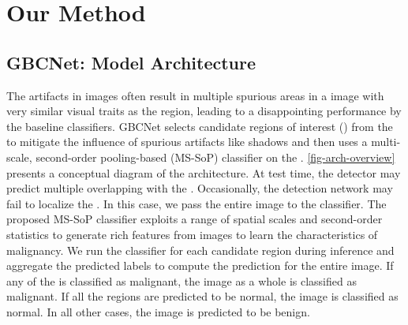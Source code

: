 
\section{Our Method}
%
\subsection{GBCNet: Model Architecture}
%
The artifacts in \usg images often result in multiple spurious areas in a \usg image with very similar visual traits as the \gb region, leading to a disappointing performance by the baseline classifiers. 
GBCNet selects candidate regions of interest (\rois) from the \usg to mitigate the influence of spurious artifacts like shadows and then uses a multi-scale, second-order pooling-based (MS-SoP) classifier on the \rois. \cref{fig-arch-overview} presents a conceptual diagram of the architecture. 
At test time, the detector may predict multiple \rois overlapping with the \gb. Occasionally, the detection network may fail to localize the \rois. In this case, we pass the entire image to the classifier. The proposed MS-SoP classifier exploits a range of spatial scales 
and second-order statistics to generate rich features from \usg images to learn the characteristics of malignancy. We run the classifier for each candidate region during inference and aggregate the predicted labels to compute the prediction for the entire image. If any of the \rois is classified as malignant, the image as a whole is classified as malignant. If all the regions are predicted to be normal, the image is classified as normal. In all other cases, the image is predicted to be benign. 

